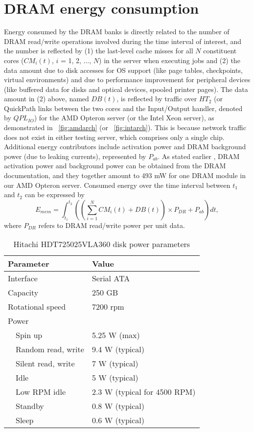 \section{DRAM energy consumption}
\label{sec:dram}
Energy consumed by the DRAM banks is directly related to the number of
DRAM read/write operations involved during the time interval of
interest, and the number is reflected by (1) the last-level cache misses
for all $N$ constituent cores ($CM_{i}(t)$, $i$ = 1, 2, ..., $N$) in
the server when executing jobs and (2) the data amount due to disk
accesses for OS support (like page tables, checkpoints, virtual
environments) and due to performance improvement for peripheral devices
(like buffered data for disks and optical devices, spooled printer
pages).  The data amount in (2) above, named $DB(t)$, is reflected by
traffic over $HT_{2}$ (or QuickPath links between the two cores and the
Input/Output handler, denoted by $QPL_{IO}$) for the AMD Opteron server
(or the Intel Xeon server), as demonstrated in
\figurename~\ref{fig:amdarch} (or \figurename~\ref{fig:intarch}).
This is because network traffic does not exist in either testing server,
which comprises only a single chip.  Additional energy contributors
include activation power and DRAM background power (due to leaking
currents), represented by $P_{ab}$.  As stated earlier
\cite{Micron2007}, DRAM activation power and background power can be
obtained from the DRAM documentation, and they together amount to 493 mW
for one DRAM module in our AMD Opteron server.  Consumed energy over the
time interval between $t_{1}$ and $t_{2}$ can be expressed by
\begin{equation*}
  \label{eq:dram}
  E_{mem}=\displaystyle\int_{t_{1}}^{t_{2}}\left( (\sum_{i=1}^{N}CM_{i}(t)+DB(t))\times
    P_{DR}+P_{ab}\right)dt,
\end{equation*} 
where $P_{DR}$ refers to DRAM read/write power per unit data.
\begin{table}[tp]
\caption{Hitachi HDT725025VLA360 disk power parameters}
\centering
\begin{tabular}{ l l }
\hline
\textbf{Parameter} & \textbf{Value} \\
\hline
  Interface & Serial ATA\\
  Capacity & 250 GB\\
  Rotational speed & 7200 rpm  \\
  Power & \\
  ~~Spin up& 5.25 W (max)\\
  ~~Random read, write & 9.4 W (typical)\\
  ~~Silent read, write & 7 W (typical)\\
  ~~Idle & 5 W (typical)  \\
  ~~Low RPM idle & 2.3 W (typical for 4500 RPM)\\
  ~~Standby & 0.8 W (typical)\\
  ~~Sleep & 0.6 W (typical)\\
\hline
\end{tabular}
\label{tab:hddparam}
\end{table}
